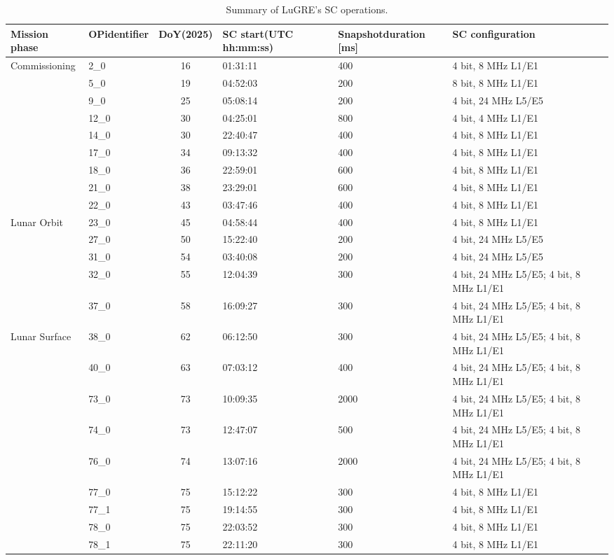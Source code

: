 \documentclass{IEEEtaes}
\begin{document}
\begin{table}[t]
\small
\caption{Summary of LuGRE's \gls{SC} operations.}
\label{tab:OPTable}
\centering
\begin{tabular}{l p{1.5cm} c p{2.5cm} p{2cm} l}
\toprule
\textbf{Mission phase} & \textbf{OP\newline identifier} & \textbf{DoY\newline (2025)} & \textbf{SC start\newline (UTC hh:mm:ss)} & \textbf{Snapshot\newline duration [ms]} &
\textbf{SC configuration} \\
\midrule
\multirow[t]{2}{*}{Commissioning}
 & 2\_0  & 16 & 01:31:11 & 400  & 4 bit, 8 MHz L1/E1 \\
\midrule
\multirow{7}{*}{Transit}
 & 5\_0  & 19 & 04:52:03 & 200  & 8 bit, 8 MHz L1/E1 \\
 & 9\_0  & 25 & 05:08:14 & 200  & 4 bit, 24 MHz L5/E5 \\
 & 12\_0 & 30 & 04:25:01 & 800  & 4 bit, 4 MHz L1/E1 \\
 & 14\_0 & 30 & 22:40:47 & 400  & 4 bit, 8 MHz L1/E1 \\
 & 17\_0 & 34 & 09:13:32 & 400  & 4 bit, 8 MHz L1/E1 \\
 & 18\_0 & 36 & 22:59:01 & 600  & 4 bit, 8 MHz L1/E1 \\
 & 21\_0 & 38 & 23:29:01 & 600  & 4 bit, 8 MHz L1/E1 \\
 & 22\_0 & 43 & 03:47:46 & 400  & 4 bit, 8 MHz L1/E1 \\
\midrule
\multirow{5}{*}{Lunar Orbit}
 & 23\_0 & 45 & 04:58:44 & 400  & 4 bit, 8 MHz L1/E1 \\
 & 27\_0 & 50 & 15:22:40 & 200  & 4 bit, 24 MHz L5/E5 \\
 & 31\_0 & 54 & 03:40:08 & 200  & 4 bit, 24 MHz L5/E5 \\
 & 32\_0 & 55 & 12:04:39 & 300  & 4 bit, 24 MHz L5/E5; 4 bit, 8 MHz L1/E1 \\
 & 37\_0 & 58 & 16:09:27 & 300  & 4 bit, 24 MHz L5/E5; 4 bit, 8 MHz L1/E1 \\
\midrule
\multirow{8}{*}{Lunar Surface}
 & 38\_0 & 62 & 06:12:50 & 300  & 4 bit, 24 MHz L5/E5; 4 bit, 8 MHz L1/E1 \\
 & 40\_0 & 63 & 07:03:12 & 400  & 4 bit, 24 MHz L5/E5; 4 bit, 8 MHz L1/E1 \\
 & 73\_0 & 73 & 10:09:35 & 2000 & 4 bit, 24 MHz L5/E5; 4 bit, 8 MHz L1/E1 \\
 & 74\_0 & 73 & 12:47:07 & 500  & 4 bit, 24 MHz L5/E5; 4 bit, 8 MHz L1/E1 \\
 & 76\_0 & 74 & 13:07:16 & 2000 & 4 bit, 24 MHz L5/E5; 4 bit, 8 MHz L1/E1 \\
 & 77\_0 & 75 & 15:12:22 & 300  & 4 bit, 8 MHz L1/E1 \\
 & 77\_1 & 75 & 19:14:55 & 300  & 4 bit, 8 MHz L1/E1 \\
 & 78\_0 & 75 & 22:03:52 & 300  & 4 bit, 8 MHz L1/E1 \\
 & 78\_1 & 75 & 22:11:20 & 300  & 4 bit, 8 MHz L1/E1 \\
\midrule
\bottomrule
\end{tabular}
\vspace{3pt}
\end{table}
\end{document}
